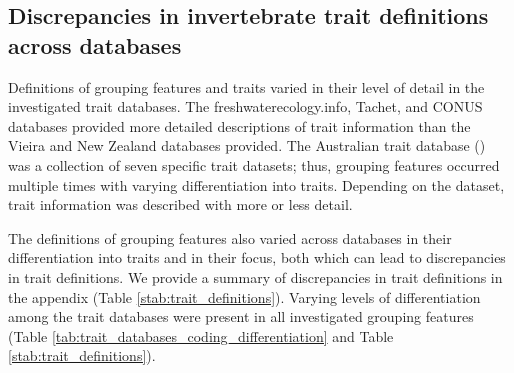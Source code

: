 \documentclass{article}
\begin{document}
\subsection*{Discrepancies in invertebrate trait definitions across databases}

Definitions of grouping features and traits varied in their level of detail in the investigated trait databases. The freshwaterecology.info, Tachet, and CONUS databases provided more detailed descriptions of trait information than the Vieira and New Zealand databases provided. The Australian trait database (\cite{kefford_integrated_2020}) was a collection of seven specific trait datasets; thus, grouping features occurred multiple times with varying differentiation into traits. Depending on the dataset, trait information was described with more or less detail.

The definitions of grouping features also varied across databases in their differentiation into traits and in their focus, both which can lead to discrepancies in trait definitions. We provide a summary of discrepancies in trait definitions in the appendix (Table \ref{stab:trait_definitions}). Varying levels of differentiation among the trait databases were present in all investigated grouping features (Table \ref{tab:trait_databases_coding_differentiation} and Table \ref{stab:trait_definitions}).
\end{document}
